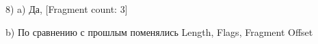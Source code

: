 \documentclass[a4paper,11pt]{article}
\begin{document}
\begin{center}
\label{fig:image}
\end{center}
8) a) Да, [Fragment count: 3]

\begin{center}
\label{fig:image}
\end{center}
b) По сравнению с прошлым поменялись Length, Flags, Fragment Offset
\end{document}
